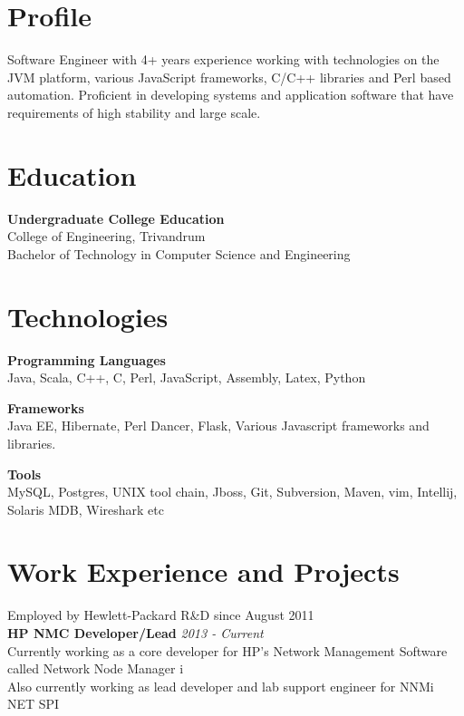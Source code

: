 \documentclass[line,margin]{res}
\begin{document}


\address{joji\_antony@gmx.com}
\address{+91 96323 41954}

\begin{resume}

\section{Profile}
Software Engineer with 4+ years experience working with technologies on the JVM platform, various JavaScript frameworks, C/C++ libraries and Perl based automation. Proficient in developing systems and application software that have requirements of high stability and large scale.

\section{Education}
{\bf Undergraduate College Education}\\
College of Engineering, Trivandrum\\
Bachelor of Technology in Computer Science and Engineering\\

\section{Technologies}

{\bf Programming Languages}\\
Java, Scala, C++, C, Perl, JavaScript, Assembly, Latex, Python

{\bf Frameworks}\\
Java EE, Hibernate, Perl Dancer, Flask, Various Javascript frameworks and libraries.

{\bf Tools}\\
MySQL, Postgres, UNIX tool chain, Jboss, Git, Subversion, Maven, vim, Intellij, Solaris MDB, Wireshark etc


\section{Work Experience and Projects}

Employed by Hewlett-Packard R\&D since August 2011\\

{\bf HP NMC Developer/Lead} \hfill {\it{2013 - Current}}\\
Currently working as a core developer for HP's Network Management Software called Network Node Manager i\\
Also currently working as lead developer and lab support engineer for NNMi NET SPI\\


\end{resume}
\end{document}
